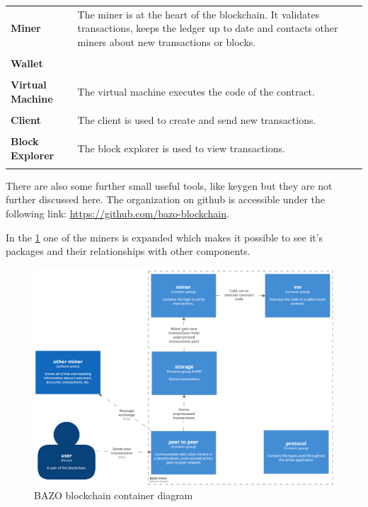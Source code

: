 \begin{tabular}[t]{ p{3cm} p{12.5cm}}
\textbf{Miner} &
The miner is at the heart of the blockchain. It validates transactions, keeps the ledger up to date and contacts other miners about new transactions or blocks. \\ \\
 
\raggedright
\textbf{Wallet} &
\\ \\
 
\raggedright
\textbf{Virtual Machine} &
The virtual machine executes the code of the contract. \\ \\
 
\textbf{Client} &
The client is used to create and send new transactions. \\ \\

\raggedright
\textbf{Block Explorer} & 
The block explorer is used to view transactions. \\ \\
\end{tabular}

There are also some further small useful tools, like keygen but they are not further discussed here. The organization on github is accessible under the following link: \href{https://github.com/bazo-blockchain}{https://github.com/bazo-blockchain}.

In the \ref{systemcontainerdiagram} one of the miners is expanded which makes it possible to see it's packages and their relationships with other components.
\begin{figure}[H]
	\begin{center}
	\includegraphics[width=\textwidth]{./images/BAZO_Container}
	\caption{BAZO blockchain container diagram}
	\label{systemcontainerdiagram}
	\end{center}
\end{figure}
\pagebreak

